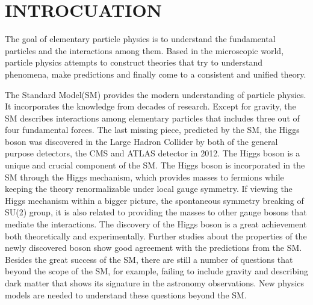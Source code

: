 
\chapter{INTROCUATION}

The goal of elementary particle physics is to understand the fundamental particles and the interactions among them. Based in the microscopic world, particle physics attempts to construct theories that try to understand phenomena, make predictions and finally come to a consistent and unified theory. 

The Standard Model(SM) provides the modern understanding of particle physics. It incorporates the knowledge from decades of research. Except for gravity, the SM describes interactions among elementary particles that includes three out of four fundamental forces. The last missing piece, predicted by the SM, the Higgs boson was discovered in the Large Hadron Collider by both of the general purpose detectors, the CMS and ATLAS detector in 2012. The Higgs boson is a unique and crucial component of the SM. The Higgs boson is incorporated in the SM through the Higgs mechanism, which provides masses to fermions while keeping the theory renormalizable under local gauge symmetry. If viewing the Higgs mechanism within a bigger picture, the spontaneous symmetry breaking of SU(2) group, it is also related to providing the masses to other gauge bosons that mediate the interactions. The discovery of the Higgs boson is a great achievement both theoretically and experimentally. Further studies about the properties of the newly discovered boson show good agreement with the predictions from the SM. Besides the great success of the SM, there are still a number of questions that beyond the scope of the SM, for example, failing to include gravity and describing dark matter that shows its signature in the astronomy observations. New physics models are needed to understand these questions beyond the SM.  

